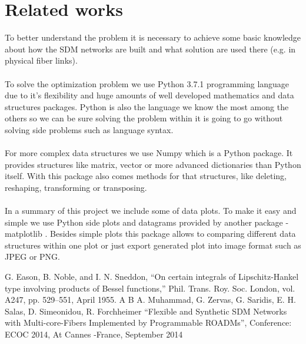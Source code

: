 \documentclass[conference]{IEEEtran}
\begin{document}
\section{Related works}
To better understand the problem it is necessary to achieve some basic knowledge about how the SDM networks are built and what solution are used there (e.g. in physical fiber links)\cite{b4}.
\\ \\
To solve the optimization problem we use Python 3.7.1\cite{b1} programming language due to it's flexibility and huge amounts of well developed mathematics and data structures packages. Python is also the language we know the most among the others so we can be sure solving the problem within it is going to go without solving side problems such as language syntax.
\\ \\
For more complex data structures we use Numpy \cite {b2} which is a Python package. It provides structures like matrix, vector or more advanced dictionaries than Python itself. With this package also comes methods for that structures, like deleting, reshaping, transforming or transposing.
\\ \\
In a summary of this project we include some of data plots. To make it easy and simple we use Python side plots and datagrams provided by another package - matplotlib \cite{b3}. Besides simple plots this package allows to comparing different data structures within one plot or just export generated plot into image format such as JPEG or PNG.

\begin{thebibliography}{00}
 G. Eason, B. Noble, and I. N. Sneddon, ``On certain integrals of Lipschitz-Hankel type involving products of Bessel functions,'' Phil. Trans. Roy. Soc. London, vol. A247, pp. 529--551, April 1955.
 A
 B
 A. Muhammad, G. Zervas, G. Saridis, E. H. Salas, D. Simeonidou, R. Forchheimer ``Flexible and Synthetic SDM Networks with Multi-core-Fibers Implemented by Programmable ROADMs'', Conference: ECOC 2014, At Cannes -France, September 2014
\end{thebibliography}
\vspace{12pt}
\end{document}
